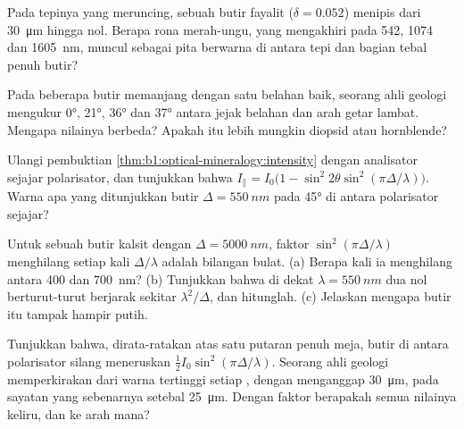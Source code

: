 \begin{exercise}[$\star\star$]\label{exo:b1:optical-mineralogy:8}
Pada tepinya yang meruncing, sebuah butir fayalit ($\delta = 0.052$) menipis dari \qty{30}{\micro m} hingga nol. Berapa rona merah-ungu, yang mengakhiri  pada 542, 1074 dan \qty{1605}{nm}, muncul sebagai pita berwarna di antara tepi dan bagian tebal penuh butir?
\end{exercise}

\begin{exercise}[$\star\star$]\label{exo:b1:optical-mineralogy:9}
Pada beberapa butir memanjang dengan satu belahan baik, seorang ahli geologi mengukur  \ang{0}, \ang{21}, \ang{36} dan \ang{37} antara jejak belahan dan arah getar lambat. Mengapa nilainya berbeda? Apakah  itu lebih mungkin diopsid atau hornblende?
\end{exercise}

\begin{exercise}[$\star\star\star$]\label{exo:b1:optical-mineralogy:10}
Ulangi pembuktian \cref{thm:b1:optical-mineralogy:intensity} dengan analisator sejajar polarisator, dan tunjukkan bahwa $I_\parallel = I_0\bigl(1 - \sin^2 2\theta\sin^2(\pi\Delta/\lambda)\bigr)$. Warna apa yang ditunjukkan butir $\Delta = \qty{550}{nm}$ pada \ang{45} di antara polarisator sejajar?
\end{exercise}

\begin{exercise}[$\star\star\star$]\label{exo:b1:optical-mineralogy:11}
Untuk sebuah butir kalsit dengan $\Delta = \qty{5000}{nm}$, faktor $\sin^2(\pi\Delta/\lambda)$ menghilang setiap kali $\Delta/\lambda$ adalah bilangan bulat. (a) Berapa kali ia menghilang antara \num{400} dan \qty{700}{nm}? (b) Tunjukkan bahwa di dekat $\lambda = \qty{550}{nm}$ dua nol berturut-turut berjarak sekitar $\lambda^2/\Delta$, dan hitunglah. (c) Jelaskan mengapa butir itu tampak hampir putih.
\end{exercise}

\begin{exercise}[$\star\star\star$]\label{exo:b1:optical-mineralogy:12}
Tunjukkan bahwa, dirata-ratakan atas satu putaran penuh meja, butir di antara polarisator silang meneruskan $\frac12 I_0\sin^2(\pi\Delta/\lambda)$. Seorang ahli geologi memperkirakan  dari warna tertinggi setiap , dengan menganggap \qty{30}{\micro m}, pada sayatan yang sebenarnya setebal \qty{25}{\micro m}. Dengan faktor berapakah semua nilainya keliru, dan ke arah mana?
\end{exercise}

